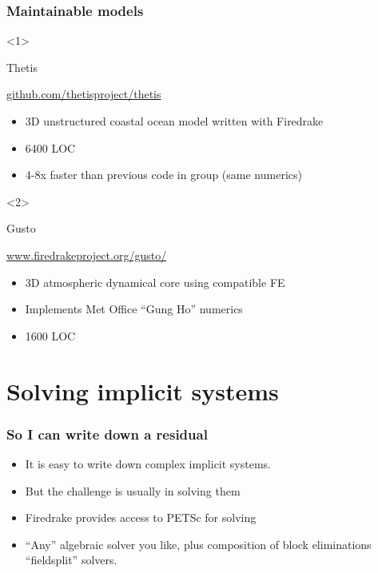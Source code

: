 \documentclass[presentation]{beamer}
\begin{document}
\begin{frame}
  \frametitle{Maintainable models}
  \begin{onlyenv}<1>
    \begin{block}{Thetis}
      \begin{center}
        \url{github.com/thetisproject/thetis}
      \end{center}
      \begin{itemize}
      \item 3D unstructured coastal ocean model written with Firedrake
      \item 6400 LOC
      \item 4-8x faster than previous code in group (same numerics)
      \end{itemize}
    \end{block}
  \end{onlyenv}
  \begin{onlyenv}<2>
    \begin{block}{Gusto}
      \begin{center}
        \url{www.firedrakeproject.org/gusto/}
      \end{center}
      \begin{itemize}
      \item 3D atmospheric dynamical core using compatible FE
      \item Implements Met Office ``Gung Ho'' numerics
      \item 1600 LOC
      \end{itemize}
    \end{block}
  \end{onlyenv}
\end{frame}

\section{Solving implicit systems}

\begin{frame}
  \frametitle{So I can write down a residual}
  \begin{itemize}
  \item It is easy to write down complex implicit systems.
  \item But the challenge is usually in solving them
  \item Firedrake provides access to PETSc for solving
  \item ``Any'' algebraic solver you like, plus composition of block eliminations ``fieldsplit'' solvers.
  \end{itemize}
\end{frame}
\end{document}
